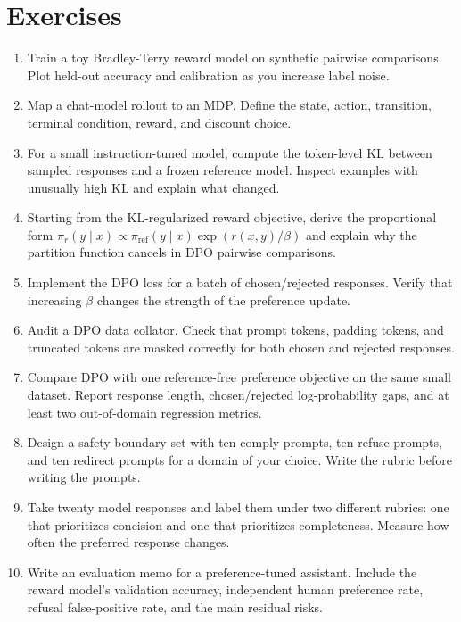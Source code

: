 \section{Exercises}
\begin{enumerate}
    \item Train a toy Bradley-Terry reward model on synthetic pairwise comparisons. Plot held-out accuracy and calibration as you increase label noise.
    \item Map a chat-model rollout to an MDP. Define the state, action, transition, terminal condition, reward, and discount choice.
    \item For a small instruction-tuned model, compute the token-level KL between sampled responses and a frozen reference model. Inspect examples with unusually high KL and explain what changed.
    \item Starting from the KL-regularized reward objective, derive the proportional form $\pi_r(y\mid x)\propto\pi_{\mathrm{ref}}(y\mid x)\exp(r(x,y)/\beta)$ and explain why the partition function cancels in DPO pairwise comparisons.
    \item Implement the DPO loss for a batch of chosen/rejected responses. Verify that increasing $\beta$ changes the strength of the preference update.
    \item Audit a DPO data collator. Check that prompt tokens, padding tokens, and truncated tokens are masked correctly for both chosen and rejected responses.
    \item Compare DPO with one reference-free preference objective on the same small dataset. Report response length, chosen/rejected log-probability gaps, and at least two out-of-domain regression metrics.
    \item Design a safety boundary set with ten comply prompts, ten refuse prompts, and ten redirect prompts for a domain of your choice. Write the rubric before writing the prompts.
    \item Take twenty model responses and label them under two different rubrics: one that prioritizes concision and one that prioritizes completeness. Measure how often the preferred response changes.
    \item Write an evaluation memo for a preference-tuned assistant. Include the reward model's validation accuracy, independent human preference rate, refusal false-positive rate, and the main residual risks.
\end{enumerate}
